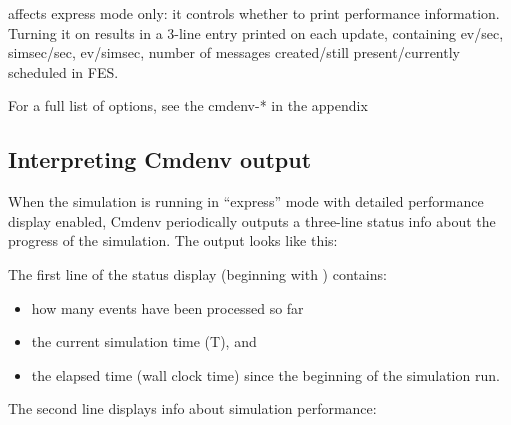  affects express mode only: it controls
whether to print performance information. Turning it on results in a 3-line
entry printed on each update, containing ev/sec, simsec/sec, ev/simsec,
number of messages created/still present/currently scheduled in FES.

For a full list of options, see the cmdenv-* in the appendix


\subsection{Interpreting Cmdenv output}
\label{sec:ch-run-sim:interpreting-cmdenv-output}

When the simulation is running in ``express'' mode with detailed
performance display enabled, Cmdenv periodically outputs a three-line
status info about the progress of the simulation.
The output looks like this:


The first line of the status display (beginning with \ttt{**})
contains:

\begin{itemize}
   \item{how many events have been processed so far}
   \item{the current simulation time (T), and}
   \item{the elapsed time (wall clock time) since the beginning of the simulation run.}
\end{itemize}

The second line displays info about simulation performance:


